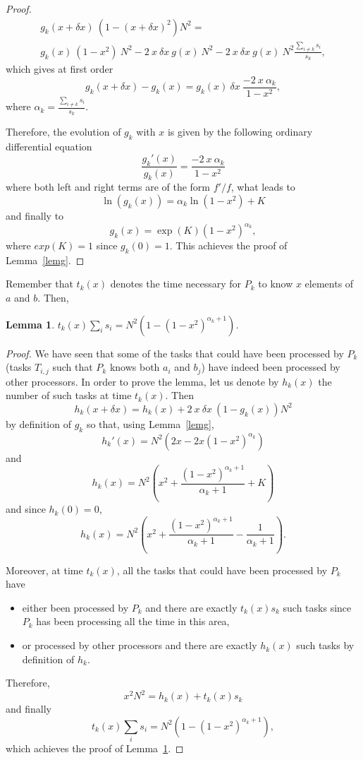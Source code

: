 \documentclass[a4paper,10pt]{article}
\newtheorem{lemma}[theorem]{Lemma}
\newcommand{\ema}[1]{\ensuremath{#1}\xspace}
\newcommand{\dx}{\ema{\delta x}}
\begin{document}
\begin{proof}
\begin{multline*}
  g_k(x+\dx) ~ \left(1 - (x+\dx)^2 \right) N^2 = \\
  g_k(x) ~ (1 - x^2 ) ~N^2 - 2 ~x ~\dx~ g(x)~ N^2 - 2 ~x~ \dx ~g(x)~ N^2 \frac{\sum_{i \neq k} s_i }{s_k},
\end{multline*}
which gives at first order
$$
g_k(x+\dx) - g_k(x) = g_k(x) ~ \dx ~\frac{- 2 ~x ~\alpha_k}{1-x^2},
$$ where $\alpha_k = \frac{\sum_{i \neq k} s_i}{s_k}$.

Therefore, the evolution of $g_k$ with $x$ is given by the following
ordinary differential equation
$$\frac{g_k'(x)}{g_k(x)} = \frac{- 2 ~x~ \alpha_k}{1-x^2}$$
where both left and right terms are of the form $f'/f$, what leads to
$$\ln (g_k(x)) =  \alpha_k \ln (1-x^2) + K$$ and finally to
$$ g_k(x) =  \exp(K) (1-x^2)^{\alpha_k}, $$
where $exp(K)=1$ since $g_k(0)=1$. This achieves the proof of
Lemma~\ref{lemg}. 
\end{proof}
\medskip

Remember that $t_k(x)$ denotes the time necessary for $P_k$ to know
$x$ elements of $a$ and $b$. Then,

\begin{lemma} 
  \label{lemT} $t_k(x) \sum_i s_i =N^2 (1-  (1-x^2)^{\alpha_k+1})$. 
\end{lemma}

\begin{proof}
  We have seen that some of the tasks that could have been processed
  by $P_k$ (tasks $T_{i,j}$ such that $P_k$ knows both $a_i$ and
  $b_j$) have indeed been processed by other processors. In order to
  prove the lemma, let us denote by $h_k(x)$ the number of such tasks
  at time $t_k(x)$. Then
$$h_k(x+\dx)= h_k(x) + 2~ x~ \dx~ (1 -g_k(x))N^2$$ by definition of $g_k$ so that, using Lemma~\ref{lemg},
$$h_k'(x)=N^2 (2 x - 2 x (1-x^2)^{\alpha_k})$$ and
$$h_k(x)= N^2 (x^2 + \frac{(1-x^2)^{\alpha_k+1}}{\alpha_k+1} + K)$$ and since $h_k(0)=0$,
$$h_k(x)= N^2 (x^2 + \frac{(1-x^2)^{\alpha_k+1}}{\alpha_k+1} - \frac{1}{\alpha_k+1}) .$$

Moreover, at time $t_k(x)$, all the tasks that could have been processed by $P_k$ have
\begin{itemize}
\item either been processed by $P_k$ and there are exactly $t_k(x) s_k$ such tasks since $P_k$ has been  processing all the time in this area,
\item or processed by other processors and there are exactly $h_k(x)$ such tasks by definition of $h_k$.
\end{itemize}
Therefore,
$$x^2 N^2 = h_k(x) + t_k(x) s_k$$
and finally
$$t_k(x) \sum_i s_i =N^2 (1- (1-x^2)^{\alpha_k+1}),$$
which achieves the proof of Lemma~\ref{lemT}.
\end{proof}
\medskip
\end{document}

